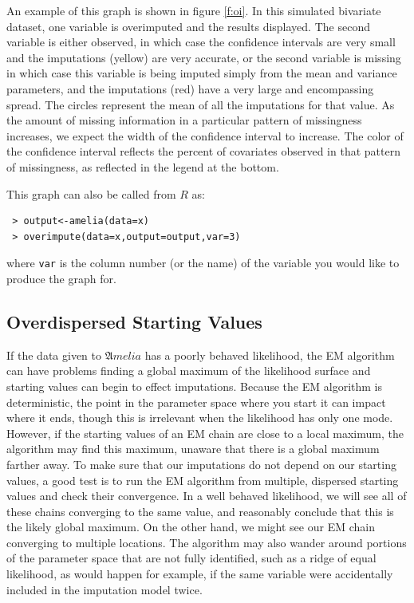 \documentclass[12pt,titlepage]{article}
\newcommand{\Amelia}{\ensuremath{\mathfrak Amelia} }
\begin{document}
An example of this graph is shown in figure \ref{f:oi}.  In this
simulated bivariate dataset, one variable is overimputed and the
results displayed.  The second variable is either observed, in which
case the confidence intervals are very small and the imputations
(yellow) are very accurate, or the second variable is missing in which
case this variable is being imputed simply from the mean and variance
parameters, and the imputations (red) have a very large and
encompassing spread.  The circles represent the mean of all the
imputations for that value.  As the amount of missing information in a
particular pattern of missingness increases, we expect the width of
the confidence interval to increase.  The color of the confidence
interval reflects the percent of covariates observed in that pattern
of missingness, as reflected in the legend at the bottom.

This graph can also be called from $R$ as:
\begin{verbatim}
 > output<-amelia(data=x) 
 > overimpute(data=x,output=output,var=3)
\end{verbatim}
where \texttt{var} is the column number (or the name) of the variable
you would like to produce the graph for.


\subsection{Overdispersed Starting Values}
\label{sec:overdisperse}
If the data given to \Amelia has a poorly behaved likelihood, the EM
algorithm can have problems finding a global maximum of the likelihood
surface and starting values can begin to effect imputations.  Because
the EM algorithm is deterministic, the point in the parameter space
where you start it can impact where it ends, though this is irrelevant
when the likelihood has only one mode.  However, if the starting
values of an EM chain are close to a local maximum, the algorithm may
find this maximum, unaware that there is a global maximum farther
away.  To make sure that our imputations do not depend on our starting
values, a good test is to run the EM algorithm from multiple,
dispersed starting values and check their convergence.  In a well
behaved likelihood, we will see all of these chains converging to the
same value, and reasonably conclude that this is the likely global
maximum.  On the other hand, we might see our EM chain converging to
multiple locations.  The algorithm may also wander around portions of
the parameter space that are not fully identified, such as a ridge of
equal likelihood, as would happen for example, if the same variable
were accidentally included in the imputation model twice.
\end{document}
